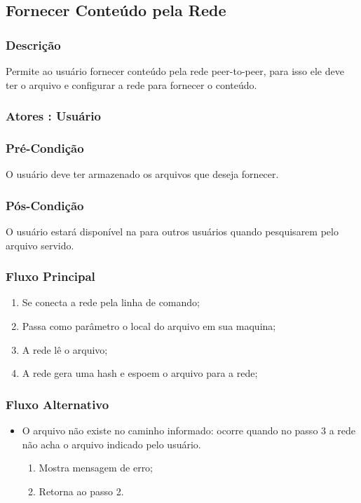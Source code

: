\subsection{Fornecer Conteúdo pela Rede}

\subsubsection{Descrição}

Permite ao usuário fornecer conteúdo pela rede peer-to-peer, para isso ele deve ter o arquivo e configurar a rede para fornecer o conteúdo.

\subsubsection{Atores : Usuário}

\subsubsection{Pré-Condição}

O usuário deve ter armazenado os arquivos que deseja fornecer.

\subsubsection{Pós-Condição}

O usuário estará disponível na para outros usuários quando pesquisarem pelo arquivo servido. 

\subsubsection{Fluxo Principal}

\begin{enumerate}
    \item Se conecta a rede pela linha de comando;
    \item Passa como parâmetro o local do arquivo em sua maquina;
    \item A rede lê o arquivo;
    \item A rede gera uma hash e espoem o arquivo para a rede;
\end{enumerate}

\subsubsection{Fluxo Alternativo}

\begin{itemize}
    \item O arquivo não existe no caminho informado: ocorre quando no passo 3 a rede não acha o arquivo indicado pelo usuário.
    \begin{enumerate}
        \item Mostra mensagem de erro;
        \item Retorna ao passo 2.
    \end{enumerate}
\end{itemize}


